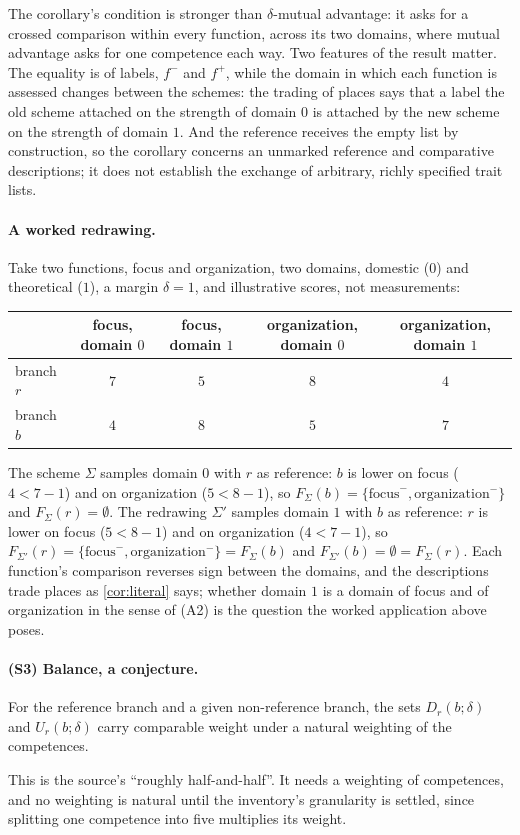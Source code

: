 \noindent The corollary's condition is stronger than $\delta$-mutual advantage: it asks for a crossed comparison within every function, across its two domains, where mutual advantage asks for one competence each way. Two features of the result matter. The equality is of labels, $f^{-}$ and $f^{+}$, while the domain in which each function is assessed changes between the schemes: the trading of places says that a label the old scheme attached on the strength of domain $0$ is attached by the new scheme on the strength of domain $1$. And the reference receives the empty list by construction, so the corollary concerns an unmarked reference and comparative descriptions; it does not establish the exchange of arbitrary, richly specified trait lists.

\paragraph{A worked redrawing.} Take two functions, focus and organization, two domains, domestic ($0$) and theoretical ($1$), a margin $\delta = 1$, and illustrative scores, not measurements:
\begin{center}
\small
\begin{tabular}{@{}lcccc@{}}
\toprule
& focus, domain $0$ & focus, domain $1$ & organization, domain $0$ & organization, domain $1$ \\
\midrule
branch $r$ & $7$ & $5$ & $8$ & $4$ \\
branch $b$ & $4$ & $8$ & $5$ & $7$ \\
\bottomrule
\end{tabular}
\end{center}
The scheme $\Sigma$ samples domain $0$ with $r$ as reference: $b$ is lower on focus ($4 < 7 - 1$) and on organization ($5 < 8 - 1$), so $F_\Sigma(b) = \{\text{focus}^{-}, \text{organization}^{-}\}$ and $F_\Sigma(r) = \emptyset$. The redrawing $\Sigma'$ samples domain $1$ with $b$ as reference: $r$ is lower on focus ($5 < 8 - 1$) and on organization ($4 < 7 - 1$), so $F_{\Sigma'}(r) = \{\text{focus}^{-}, \text{organization}^{-}\} = F_\Sigma(b)$ and $F_{\Sigma'}(b) = \emptyset = F_\Sigma(r)$. Each function's comparison reverses sign between the domains, and the descriptions trade places as \autoref{cor:literal} says; whether domain $1$ is a domain of focus and of organization in the sense of (A2) is the question the worked application above poses.

\paragraph{(S3) Balance, a conjecture.}
\begin{conjecture}[Balance]
\label{conj:balance}
For the reference branch and a given non-reference branch, the sets $D_r(b;\delta)$ and $U_r(b;\delta)$ carry comparable weight under a natural weighting of the competences.
\end{conjecture}
\noindent This is the source's ``roughly half-and-half''. It needs a weighting of competences, and no weighting is natural until the inventory's granularity is settled, since splitting one competence into five multiplies its weight.

